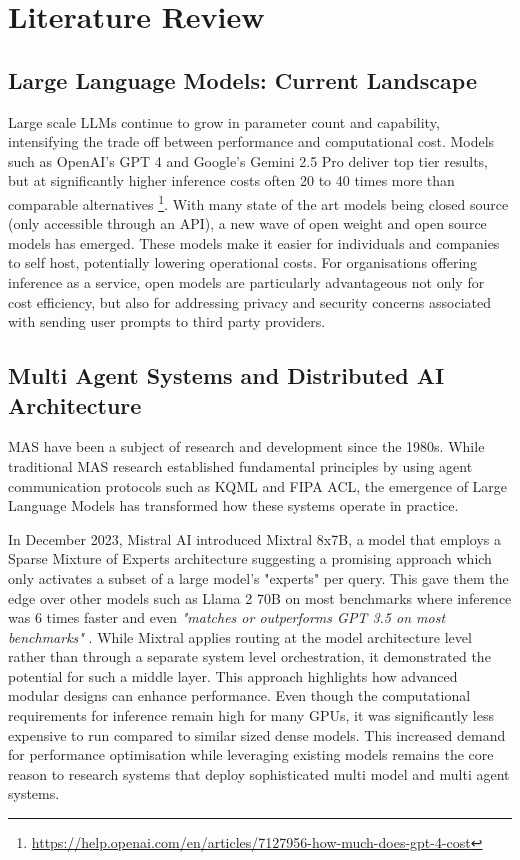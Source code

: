 \chapter{Literature Review}
\label{ch:lit_rev} %

\section{Large Language Models: Current Landscape}

Large scale LLMs continue to grow in parameter count and capability, intensifying the trade off between performance and computational cost. Models such as OpenAI's GPT 4 and Google's Gemini 2.5 Pro deliver top tier results, but at significantly higher inference costs often 20 to 40 times more than comparable alternatives \footnote{\url{https://help.openai.com/en/articles/7127956-how-much-does-gpt-4-cost}}. With many state of the art models being closed source (only accessible through an API), a new wave of open weight and open source models has emerged. These models make it easier for individuals and companies to self host, potentially lowering operational costs. For organisations offering inference as a service, open models are particularly advantageous not only for cost efficiency, but also for addressing privacy and security concerns associated with sending user prompts to third party providers.

\section{Multi Agent Systems and Distributed AI Architecture}

MAS have been a subject of research and development since the 1980s. While traditional MAS research established fundamental principles by using agent communication protocols such as KQML and FIPA ACL, the emergence of Large Language Models has transformed how these systems operate in practice.

In December 2023, Mistral AI introduced Mixtral 8x7B, a model that employs a Sparse Mixture of Experts architecture suggesting a promising approach which only activates a subset of a large model's "experts" per query. This gave them the edge over other models such as Llama 2 70B on most benchmarks where inference was 6 times faster and even \textit{"matches or outperforms GPT 3.5 on most benchmarks"} \cite{hu2024routerbenchbenchmarkmultillmrouting}. While Mixtral applies routing at the model architecture level rather than through a separate system level orchestration, it demonstrated the potential for such a middle layer. This approach highlights how advanced modular designs can enhance performance. Even though the computational requirements for inference remain high for many GPUs, it was significantly less expensive to run compared to similar sized dense models. This increased demand for performance optimisation while leveraging existing models remains the core reason to research systems that deploy sophisticated multi model and multi agent systems.

